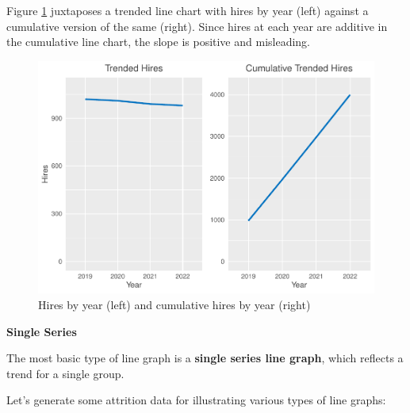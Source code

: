 \documentclass[
]{book}
\begin{document}
Figure \ref{fig:cum-hires-trend} juxtaposes a trended line chart with hires by year (left) against a cumulative version of the same (right). Since hires at each year are additive in the cumulative line chart, the slope is positive and misleading.

\begin{figure}

{\centering \includegraphics[width=1\linewidth]{The_Fundamentals_of_People_Analytics_files/figure-latex/cum-hires-trend-1} 

}

\caption{Hires by year (left) and cumulative hires by year (right)}\label{fig:cum-hires-trend}
\end{figure}

\textbf{Single Series}

The most basic type of line graph is a \textbf{single series line graph}, which reflects a trend for a single group.

Let's generate some attrition data for illustrating various types of line graphs:
\end{document}
